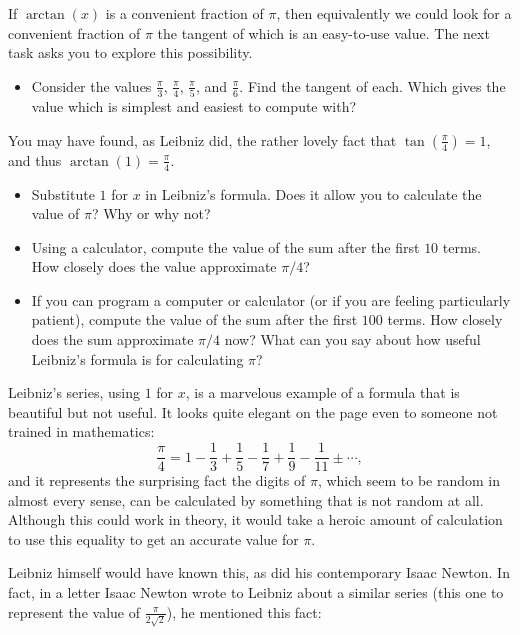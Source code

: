 \documentclass[11pt]{article}
\newcounter{tasknumb}
\newcommand{\tasknumb}{\stepcounter{tasknumb}\textmd{\textbf{$\fbox{$\fbox{Task \thetasknumb}$}$}}}
\newenvironment{task}%
 {\begin{itemize}
 \item[\tasknumb]  }
{
    \end{itemize}    }%
\begin{document}
If $\arctan(x)$ is a convenient fraction of $\pi$, then equivalently we could look for a convenient fraction of $\pi$ the tangent of which is an easy-to-use value.  The next task asks you to explore this possibility.
\begin{task}
Consider the values $\frac{\pi}{3}$, $\frac{\pi}{4}$, $\frac{\pi}{5}$, and $\frac{\pi}{6}$.  Find the tangent of each.  Which gives the value which is simplest and easiest to compute with?
\end{task}

You may have found, as Leibniz did, the rather lovely fact that $\tan(\frac{\pi}{4}) = 1$, and thus $\arctan(1) = \frac{\pi}{4}$.

\begin{task}
Substitute $1$ for $x$ in Leibniz's formula.  Does it allow you to calculate the value of $\pi$?  Why or why not?
\end{task}


\begin{task}
Using a calculator, compute the value of the sum after the first $10$ terms. How closely does the value approximate $\pi/4$?
\end{task}

\begin{task}
If you can program a computer or calculator (or if you are feeling particularly patient), compute the value of the sum after the first $100$ terms. How closely does the sum approximate $\pi/4$ now? What can you say about how useful Leibniz's formula is for calculating $\pi$?
\end{task}

Leibniz's series, using $1$ for $x$, is a marvelous example of a formula that is beautiful but not useful. It looks quite elegant on the page even to someone not trained in mathematics:
$$
\frac{\pi}{4} = 1 - \frac{1}{3} + \frac{1}{5} - \frac{1}{7} + \frac{1}{9} - \frac{1}{11} \pm \cdots,
$$
and it represents the surprising fact the digits of $\pi$, which seem to be random in almost every sense, can be calculated by something that is not random at all.  Although this could work in theory, it would take a heroic amount of calculation to use this equality to get an accurate value for $\pi$.

Leibniz himself would have known this, as did his contemporary Isaac Newton.   In fact, in a letter Isaac Newton wrote to Leibniz about a similar series (this one to represent the value of $\frac{\pi}{2 \sqrt{2}}$), he mentioned this fact:
\end{document}
